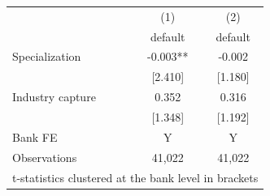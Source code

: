 {
\begin{tabular}{l*{2}{c}}
\toprule\toprule
                              &\multicolumn{1}{c}{(1)}&\multicolumn{1}{c}{(2)}\\
                              &\multicolumn{1}{c}{default}&\multicolumn{1}{c}{default}\\
\toprule
Specialization                &      -0.003** &      -0.002   \\
                              &     [2.410]   &     [1.180]   \\
[1em]
Industry capture              &       0.352   &       0.316   \\
                              &     [1.348]   &     [1.192]   \\
[1em]
Bank FE                       &          Y    &          Y    \\
Observations                  &     41,022    &     41,022    \\
\bottomrule
\multicolumn{3}{l}{\footnotesize t-statistics clustered at the bank level in brackets}\\
\end{tabular}
}
